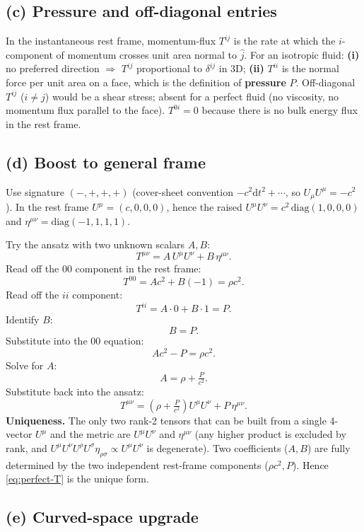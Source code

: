 \documentclass[11pt]{article}
\newcommand{\de}{\mathrm{d}}
\begin{document}
\subsection*{(c) Pressure and off-diagonal entries}

In the instantaneous rest frame, momentum-flux $T^{ij}$ is the rate at which the $i$-component of momentum crosses unit area normal to $\hat j$. For an isotropic fluid: \textbf{(i)} no preferred direction $\Rightarrow$ $T^{ij}$ proportional to $\delta^{ij}$ in 3D; \textbf{(ii)} $T^{ii}$ is the normal force per unit area on a face, which is the definition of \textbf{pressure} $P$. Off-diagonal $T^{ij}$ ($i\ne j$) would be a shear stress; absent for a perfect fluid (no viscosity, no momentum flux parallel to the face). $T^{0i} = 0$ because there is no bulk energy flux in the rest frame.

\subsection*{(d) Boost to general frame}

Use signature $(-,+,+,+)$ (cover-sheet convention $-c^2\de t^2+\cdots$, so $U_\mu U^\mu = -c^2$). In the rest frame $U^\mu = (c,0,0,0)$, hence the raised $U^\mu U^\nu = c^2\,\text{diag}(1,0,0,0)$ and $\eta^{\mu\nu} = \text{diag}(-1,1,1,1)$.

Try the ansatz with two unknown scalars $A,B$:
\[ T^{\mu\nu} = A\,U^\mu U^\nu + B\,\eta^{\mu\nu}. \]
Read off the $00$ component in the rest frame:
\[ T^{00} = A c^2 + B(-1) = \rho c^2. \]
Read off the $ii$ component:
\[ T^{ii} = A\cdot 0 + B\cdot 1 = P. \]
Identify $B$:
\[ B = P. \]
Substitute into the $00$ equation:
\[ A c^2 - P = \rho c^2. \]
Solve for $A$:
\[ A = \rho + \tfrac{P}{c^2}. \]
Substitute back into the ansatz:
\begin{equation}
\boxed{\;T^{\mu\nu} = \left(\rho + \tfrac{P}{c^2}\right) U^\mu U^\nu + P\,\eta^{\mu\nu}.\;}
\label{eq:perfect-T}
\end{equation}
\textbf{Uniqueness.} The only two rank-2 tensors that can be built from a single 4-vector $U^\mu$ and the metric are $U^\mu U^\nu$ and $\eta^{\mu\nu}$ (any higher product is excluded by rank, and $U^\mu U^\nu U^\rho U^\sigma\eta_{\rho\sigma} \propto U^\mu U^\nu$ is degenerate). Two coefficients ($A,B$) are fully determined by the two independent rest-frame components ($\rho c^2, P$). Hence \eqref{eq:perfect-T} is the unique form.

\subsection*{(e) Curved-space upgrade}
\end{document}
